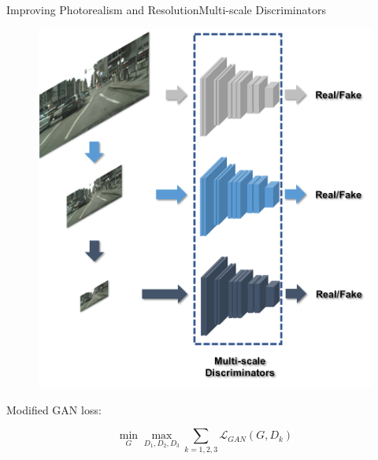 \documentclass{beamer}
\begin{document}
\begin{frame}{Improving Photorealism and Resolution}{Multi-scale  Discriminators}
	\begin{figure}
	\centering
	\includegraphics[height=0.6\textheight]{images/multi-scale}
\end{figure}
%
%
\begin{beamerboxesrounded}[upper=uppercol,lower=lowercol,shadow=false]{Modified GAN loss:}

\begin{equation}
\min_G\max_{D_1,D_2,D_3}\sum_{k=1,2,3} \mathcal{L}_{GAN}(G,D_k)
\end{equation}
\end{beamerboxesrounded}

\end{frame}
\end{document}
